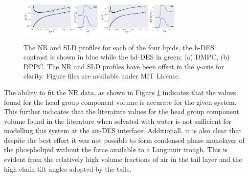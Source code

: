 \documentclass[twoside,twocolumn,9pt]{article}
\begin{document}
\begin{figure}
	\centering
	\includegraphics[width=0.36\textwidth]{figures/nDMPC_all_data}
	\includegraphics[width=0.36\textwidth]{figures/nDPPC_all_data}
	\caption{The NR and SLD profiles for each of the four lipids, the h-DES contrast is shown in blue while the hd-DES in green; (a) DMPC, (b) DPPC. The NR and SLD profiles have been offset in the $y$-axis for clarity. Figure files are available under MIT License.\cite{mccluskey_2018}}
	\label{fig:neutron}
\end{figure}

The ability to fit the NR data, as shown in Figure \ref{fig:neutron} indicates that the values found for the head group component volume is accurate for the given system. This further indicates that the literature values for the head group component volume found in the literature when solvated with water is not sufficient for modelling this system at the air-DES interface. Additionall, it is also clear that despite the best effort it was not possible to form condensed phase monolayer of the phospholipid without the force available to a Langmuir trough. This is evident from the relatively high volume fractions of air in the tail layer and the high chain tilt angles adopted by the tails. 
\end{document}

